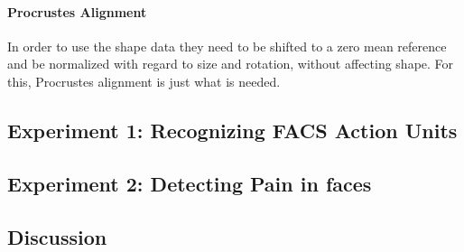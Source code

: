 \documentclass[Main]{subfiles}
\begin{document}
			\paragraph{Procrustes Alignment} %
				\label{par:procrustes_alignment}
				In order to use the shape data they need to be shifted to a zero mean reference and be normalized with regard to size and rotation, without affecting shape.
				For this, Procrustes alignment is just what is needed.

				





		

	\subsection{Experiment 1: Recognizing FACS Action Units} %
		\label{sub:experiment_1_recognizing_facs_action_units}
		

	\subsection{Experiment 2: Detecting Pain in faces} %
		\label{sub:experiment_2_detecting_pain_in_faces}
		

	\subsection{Discussion} %
	\label{sub:discussion}
	

\end{document}
